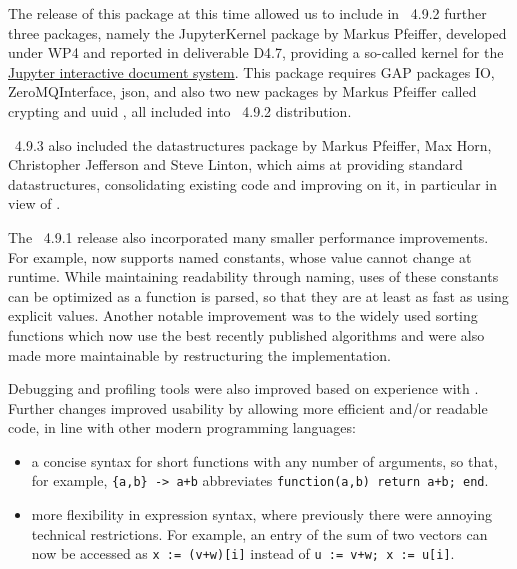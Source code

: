 \documentclass{deliverablereport}
\begin{document}

The release of this package at this time allowed us to include in \GAP~4.9.2
further three packages, namely the {\sf JupyterKernel} package \cite{JupyterKernel} 
by Markus Pfeiffer, developed under WP4 and reported in deliverable D4.7,
providing a so-called kernel for the
\href{https://jupyter.org/}{Jupyter interactive document system}. This package
requires GAP packages {\sf IO}, {\sf ZeroMQInterface}, {\sf json},
and also two new packages by Markus Pfeiffer called
{\sf crypting} and {\sf uuid} \cite{crypting,uuid}, all included 
into \GAP~4.9.2 distribution.

\GAP~4.9.3 also included the {\sf datastructures} package \cite{datastructures}
by Markus Pfeiffer, Max Horn, Christopher Jefferson and Steve Linton, which aims 
at providing standard datastructures, consolidating existing code and improving 
on it, in particular in view of \HPCGAP.

The \GAP~4.9.1 release also incorporated many smaller performance improvements. For example,
\GAP now supports named constants, whose value cannot change 
at runtime. While maintaining readability through naming, uses of
these constants can be optimized as a function is parsed, so that they
are at least as fast as using explicit values. Another notable improvement was
to the widely used  sorting functions which now use the best
recently published algorithms and were also made more maintainable by
restructuring the implementation.

Debugging  and profiling tools were also improved based on experience with
. Further changes improved \GAP
usability by allowing more efficient and/or readable code, in line
with other modern programming languages:
\begin{itemize}
  \item a concise syntax for short
    functions with any number of arguments, so that, for example,
    \verb|{a,b} -> a+b| abbreviates \verb|function(a,b) return a+b; end|. 
\item more flexibility in \GAP expression syntax,
  where previously there were annoying technical restrictions. For
  example, an entry of the sum of two vectors can now be accessed as
  \verb|x := (v+w)[i]| instead of \verb|u := v+w; x := u[i]|.
  

\end{itemize}
\end{document}
